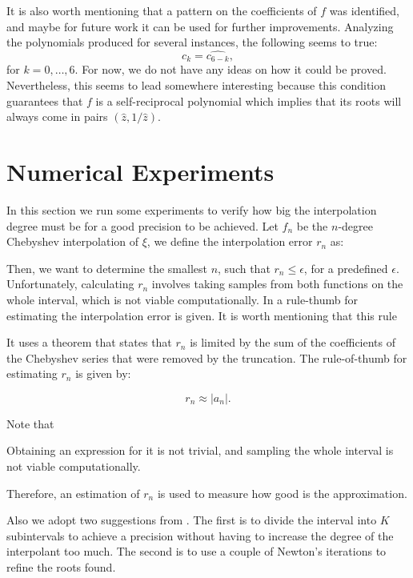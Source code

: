 It is also worth mentioning that a pattern on the coefficients of $f$ was identified, and maybe for future work it can be used for further improvements. Analyzing the polynomials produced for several instances, the following seems to true:
\begin{equation}
c_k = \hat{c_{6-k}},
\end{equation}
for $k=0, \dots, 6$. For now, we do not have any ideas on how it could be proved. Nevertheless, this seems to lead somewhere interesting because this condition guarantees that $f$ is a self-reciprocal polynomial which implies that its roots will always come in pairs $(\hat{z}, 1/\hat{z})$.

\section{Numerical Experiments}

In this section we run some experiments to verify how big the interpolation degree must be for a good precision to be achieved. 
Let $f_n$ be the $n$-degree Chebyshev interpolation of $\xi$, we define the interpolation error $r_n$ as:



Then, we want to determine the smallest $n$, such that $r_n \le \epsilon$, for a predefined $\epsilon$. Unfortunately, calculating $r_n$ involves taking samples from both functions on the whole interval, which is not viable computationally. In  a rule-thumb for estimating the interpolation error is given. It is worth mentioning that this rule 

It uses a theorem that states that $r_n$ is limited by the sum of the coefficients of the Chebyshev series that were removed by the truncation. The rule-of-thumb for estimating $r_n$ is given by:

\begin{equation}
r_n \approx |a_n|.
\end{equation}

Note that 

Obtaining an expression for it is not trivial, and sampling the whole interval is not viable computationally. 

Therefore, an estimation of $r_n$ is used to measure how good is the approximation.

Also we adopt two suggestions from \cite{boyd:2013}. The first is to divide the interval into $K$ subintervals to achieve a precision without having to increase the degree of the interpolant too much. The second is to use a couple of Newton's iterations to refine the roots found. 

